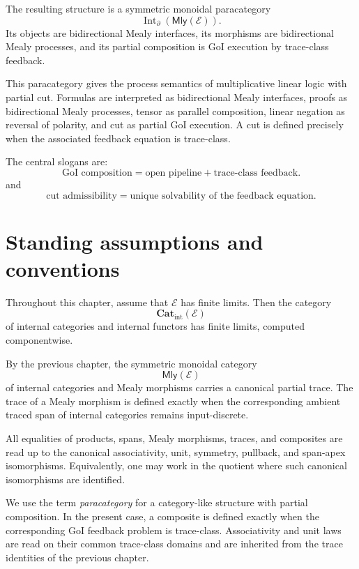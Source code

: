 The resulting structure is a symmetric monoidal paracategory
\[
\operatorname{Int}_{\partial}(\mathsf{Mly}(\mathcal E)).
\]
Its objects are bidirectional Mealy interfaces, its morphisms are
bidirectional Mealy processes, and its partial composition is GoI execution by
trace-class feedback.

This paracategory gives the process semantics of multiplicative linear logic
with partial cut.  Formulas are interpreted as bidirectional Mealy interfaces,
proofs as bidirectional Mealy processes, tensor as parallel composition,
linear negation as reversal of polarity, and cut as partial GoI execution.
A cut is defined precisely when the associated feedback equation is
trace-class.

The central slogans are:
\[
\boxed{
\text{GoI composition}
=
\text{open pipeline}
+
\text{trace-class feedback}.
}
\]
and
\[
\boxed{
\text{cut admissibility}
=
\text{unique solvability of the feedback equation}.
}
\]

\section{Standing assumptions and conventions}
\label{sec:goi-standing-assumptions}

Throughout this chapter, assume that \(\mathcal E\) has finite limits.  Then
the category
\[
\mathbf{Cat}_{\mathrm{int}}(\mathcal E)
\]
of internal categories and internal functors has finite limits, computed
componentwise.

By the previous chapter, the symmetric monoidal category
\[
\mathsf{Mly}(\mathcal E)
\]
of internal categories and Mealy morphisms carries a canonical partial trace.
The trace of a Mealy morphism is defined exactly when the corresponding
ambient traced span of internal categories remains input-discrete.

All equalities of products, spans, Mealy morphisms, traces, and composites are
read up to the canonical associativity, unit, symmetry, pullback, and span-apex
isomorphisms.  Equivalently, one may work in the quotient where such canonical
isomorphisms are identified.

We use the term \emph{paracategory} for a category-like structure with partial
composition.  In the present case, a composite is defined exactly when the
corresponding GoI feedback problem is trace-class.  Associativity and unit laws
are read on their common trace-class domains and are inherited from the trace
identities of the previous chapter.

